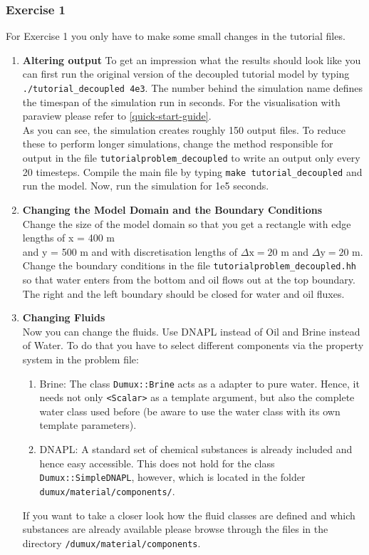 \subsubsection{Exercise 1}
\renewcommand{\labelenumi}{\alph{enumi})}
For Exercise 1 you only have to make some small changes in the tutorial files.
\begin{enumerate}
\item \textbf{Altering output}
To get an impression what the results should look like you can first run the original version of the decoupled tutorial model by typing  \texttt{./tutorial\_decoupled 4e3}. The number behind the simulation name defines the timespan of the simulation run in seconds. For the visualisation with paraview please refer to \ref{quick-start-guide}.\\
As you can see, the simulation creates roughly 150 output files. To reduce these to perform longer simulations, change the method responsible for output in the file \texttt{tutorialproblem\_decoupled} to write an output only every 20 timesteps. Compile the main file by typing \texttt{make tutorial\_decoupled} and run the model. Now, run the simulation for 1e5 seconds.

\item \textbf{Changing the Model Domain and the Boundary Conditions} \\
Change the size of the model domain so that you get a rectangle
with edge lengths of x = 400 m \\  and y = 500 m and with discretisation lengths of  $\Delta \text{x} = 20$ m and $\Delta \text{y} = 20$ m. \\
Change the boundary conditions in the file \texttt{tutorialproblem\_decoupled.hh} so that water enters from the bottom and oil flows out at the top boundary. The right and the left boundary should be closed for water and oil fluxes.  \\

\item \textbf{Changing Fluids} \\
Now you can change the fluids. Use DNAPL instead of Oil and Brine instead of Water. To do that you have to select different components via the property system in the problem file:
\begin{enumerate}
 \item Brine: The class \texttt{Dumux::Brine} acts as a adapter to pure water. Hence, it needs not only \texttt{<Scalar>} as a template argument, but also the complete water class used before (be aware to use the water class with its own template parameters).
 \item DNAPL: A standard set of chemical substances is already included and hence easy accessible. This does not hold for the class \texttt{Dumux::SimpleDNAPL}, however, which is located in the folder \texttt{dumux/material/components/}.
\end{enumerate}
If you want to take a closer look how the fluid classes are defined and which substances are already available please browse through the files in the directory
\texttt{/dumux/material/components}.


\end{enumerate}
